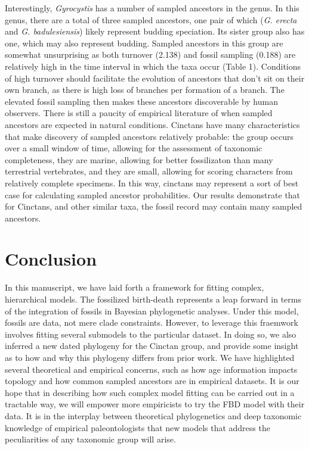 \documentclass{article}
\begin{document}
Interestingly, \textit{Gyrocystis} has a number of sampled ancestors in the genus. In this genus, there are a total of three sampled ancestors, one pair of which (\textit{G. erecta} and \textit{G. badulesiensis}) likely represent budding speciation.
Its sister group also has one, which may also represent budding.
Sampled ancestors in this group are somewhat unsurprising as both turnover (2.138) and fossil sampling (0.188) are relatively high in the time interval in which the taxa occur (Table 1). 
Conditions of high turnover should facilitate the evolution of ancestors that don't sit on their own branch, as there is high loss of branches per formation of a branch.
The elevated fossil sampling then makes these ancestors discoverable by human observers. 
There is still a paucity of empirical literature of when sampled ancestors are expected in natural conditions.
Cinctans have many characteristics that make discovery of sampled ancestors relatively probable: the group occurs over a small window of time, allowing for the assessment of taxonomic completeness, they are marine, allowing for better fossilizaton than many terrestrial vertebrates, and they are small, allowing for scoring characters from relatively complete specimens.
In this way, cinctans may represent a sort of best case for calculating sampled ancestor probabilities.
Our results demonstrate that for Cinctans, and other similar taxa, the fossil record may contain many sampled ancestors.

\section{Conclusion}

In this manuscript, we have laid forth a framework for fitting complex, hierarchical models. 
The fossilized birth-death represents a leap forward in terms of the integration of fossils in Bayesian phylogenetic analyses. 
Under this model, fossils are data, not mere clade constraints.
However, to leverage this fraemwork involves fitting several submodels to the particular dataset.
In doing so, we also inferred a new dated phylogeny for the Cinctan group, and provide some insight as to how and why this phylogeny differs from prior work.
We have highlighted several theoretical and empirical concerns, such as how age information impacts topology and how common sampled ancestors are in empirical datasets.
It is our hope that in describing how such complex model fitting can be carried out in a tractable way, we will empower more empiricists to try the FBD model with their data.
It is in the interplay between theoretical phylogenetics and deep taxonomic knowledge of empirical paleontologists that new models that address the peculiarities of any taxonomic group will arise.
\end{document}
